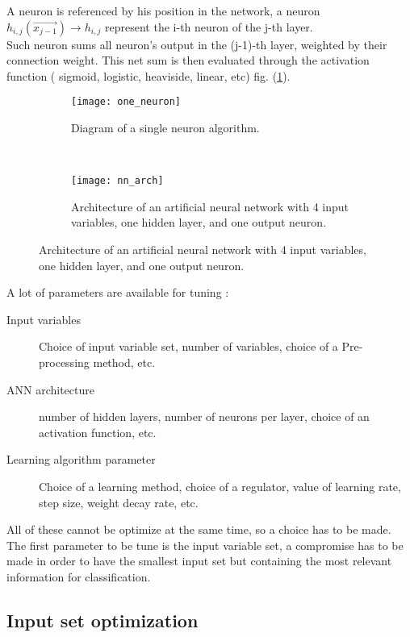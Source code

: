 A neuron is referenced by his position in the network, a neuron $h_{i,j}(\vec{x_{j-1}}) \rightarrow h_{i,j}$ represent the i-th neuron of the j-th layer.\\
Such neuron sums all neuron's output in the (j-1)-th layer, weighted by their connection weight. This net sum is then evaluated through the activation function ( sigmoid, logistic, heaviside, linear, etc) fig. (\ref{one_neuron}).

\begin{figure}[h!]
\centering
    \begin{subfigure}[h!]{0.6\textwidth}
    \centering
    	\texttt{[image: one\_neuron]}
    	\caption{Diagram of a single neuron algorithm.}
    	\label{one_neuron}
	\end{subfigure}
	~
    \begin{subfigure}[h!]{0.35\textwidth}
    \centering
    	\texttt{[image: nn\_arch]}
    	\caption{Architecture of an artificial neural network with 4 input variables, one hidden layer, and one output neuron.}
    	\label{nn_arch}
	\end{subfigure}
\end{figure}


A lot of parameters are available for tuning :
\begin{description}
    \item [Input variables] Choice of input variable set, number of variables, choice of a Pre-processing method, etc.
    \item [ANN architecture] number of hidden layers, number of neurons per layer, choice of an activation function, etc.
    \item [Learning algorithm parameter] Choice of a learning method, choice of a regulator, value of learning rate, step size, weight decay rate, etc.
\end{description}

All of these cannot be optimize at the same time, so a choice has to be made.\\
The first parameter to be tune is the input variable set, a compromise has to be made in order to have the smallest input set but containing the most relevant information for classification.

\subsection{Input set optimization}

